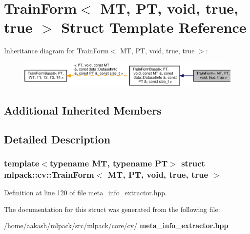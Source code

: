 \section{Train\+Form$<$ MT, PT, void, true, true $>$ Struct Template Reference}
\label{structmlpack_1_1cv_1_1TrainForm_3_01MT_00_01PT_00_01void_00_01true_00_01true_01_4}


Inheritance diagram for Train\+Form$<$ MT, PT, void, true, true $>$\+:
\nopagebreak
\begin{figure}[H]
\begin{center}
\leavevmode
\includegraphics[width=350pt]{structmlpack_1_1cv_1_1TrainForm_3_01MT_00_01PT_00_01void_00_01true_00_01true_01_4__inherit__graph}
\end{center}
\end{figure}
\subsection*{Additional Inherited Members}


\subsection{Detailed Description}
\subsubsection*{template$<$typename MT, typename PT$>$\newline
struct mlpack\+::cv\+::\+Train\+Form$<$ M\+T, P\+T, void, true, true $>$}



Definition at line 120 of file meta\+\_\+info\+\_\+extractor.\+hpp.



The documentation for this struct was generated from the following file\+:\begin{DoxyCompactItemize}
\item 
/home/aakash/mlpack/src/mlpack/core/cv/\textbf{ meta\+\_\+info\+\_\+extractor.\+hpp}\end{DoxyCompactItemize}
